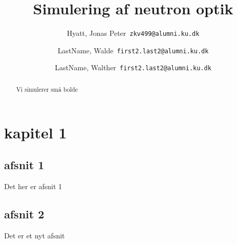 \documentclass[]{report}
\title{Simulering af neutron optik}
\author{
    Hyatt, Jonas Peter\ 
    \texttt{zkv499@alumni.ku.dk}
    \and
    LastName, Walde\ 
    \texttt{first2.last2@alumni.ku.dk}
    \and
    LastName, Walther\ 
    \texttt{first2.last2@alumni.ku.dk}
}
\begin{document}
\maketitle

\begin{abstract}
    Vi simulerer små bolde
\end{abstract}

\chapter{kapitel 1}

\section{afsnit 1}
Det her er afsnit 1


\section{afsnit 2}
Det er et nyt afsnit
\end{document}
